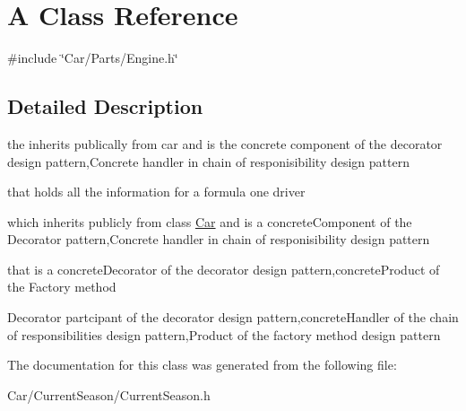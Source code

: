 \hypertarget{classA}{}\section{A Class Reference}
\label{classA}


{\ttfamily \#include \char`\"{}Car/\+Parts/\+Engine.\+h\char`\"{}}



\subsection{Detailed Description}
the inherits publically from car and is the concrete component of the decorator design pattern,Concrete handler in chain of responisibility design pattern

that holds all the information for a formula one driver

which inherits publicly from class \hyperlink{classCar}{Car} and is a concrete\+Component of the Decorator pattern,Concrete handler in chain of responisibility design pattern

that is a concrete\+Decorator of the decorator design pattern,concrete\+Product of the Factory method

Decorator partcipant of the decorator design pattern,concrete\+Handler of the chain of responsibilities design pattern,Product of the factory method design pattern 

The documentation for this class was generated from the following file\+:\begin{DoxyCompactItemize}
\item 
Car/\+Current\+Season/Current\+Season.\+h\end{DoxyCompactItemize}
